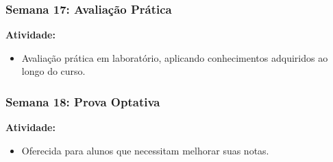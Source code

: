 \begin{frame}[fragile]
  \frametitle{Semana 17: Avaliação Prática}
  \textbf{Atividade:}
  \begin{itemize}
    \item Avaliação prática em laboratório, aplicando conhecimentos adquiridos ao longo do curso.
  \end{itemize}
\end{frame}

\begin{frame}[fragile]
  \frametitle{Semana 18: Prova Optativa}
  \textbf{Atividade:}
  \begin{itemize}
    \item Oferecida para alunos que necessitam melhorar suas notas.
  \end{itemize}
\end{frame}


